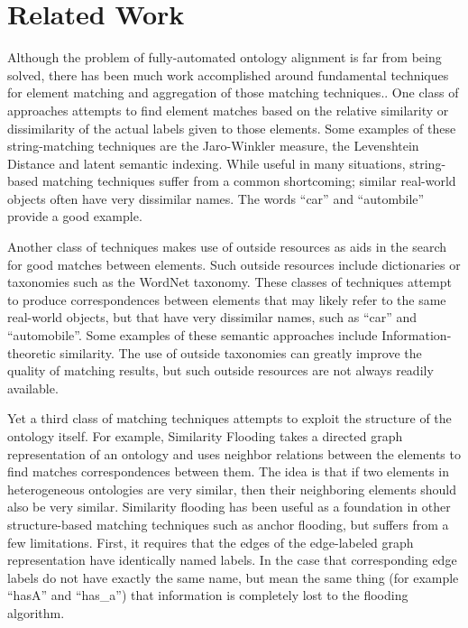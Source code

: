 \documentclass[letterpaper,twocolumn,12pt]{article}
\begin{document}
\section{Related Work}

Although the problem of fully-automated ontology alignment is far from being solved,
there has been much work accomplished around fundamental techniques for element
matching and aggregation of those matching techniques.\cite{euzenat:2007:ontology}.
One class of approaches
attempts to find element matches based on the relative similarity or dissimilarity
of the actual labels given to those elements. Some examples of these string-matching 
techniques are the Jaro-Winkler measure, the Levenshtein Distance and latent semantic 
indexing.
%
While useful in many situations, string-based matching techniques suffer from a common 
shortcoming; similar real-world objects often have very dissimilar names. The words
``car'' and ``autombile'' provide a good example.

Another class of techniques makes use of outside resources as aids in the search for
good matches between elements. Such outside resources include dictionaries or taxonomies
such as the WordNet taxonomy. These classes of techniques attempt to produce correspondences
between elements that may likely refer to the same real-world objects, but that have very
dissimilar names, such as ``car'' and ``automobile''. Some examples of these semantic 
approaches include Information-theoretic similarity.
%
The use of outside taxonomies can greatly improve the quality of matching results,
but such outside resources are not always readily available.

Yet a third class of matching techniques attempts to exploit the structure of the ontology
itself. For example, Similarity Flooding \cite{melnik:2002:similarity} takes a directed graph representation of an 
ontology and uses neighbor relations between the elements to find matches correspondences
between them. The idea is that if two elements in heterogeneous ontologies are very similar,
then their neighboring elements should also be very similar.
%
Similarity flooding has been useful as a foundation in other structure-based
matching techniques such as anchor flooding,
but suffers from 
a few limitations. First, it requires that the edges of the edge-labeled graph 
representation have identically named labels. In the case that corresponding edge labels
do not have exactly the same name, but mean the same thing (for example ``hasA'' and ``has\_a'')
that information is completely lost to the flooding algorithm. 
\end{document}
